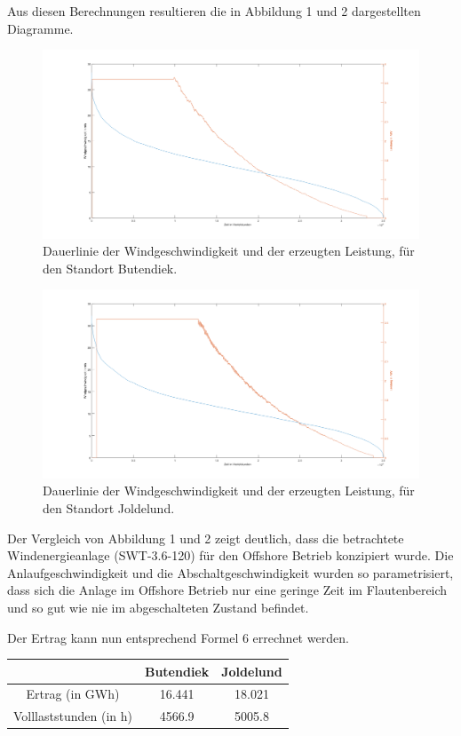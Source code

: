 \documentclass[a4paper,12pt]{article}
\begin{document}
	Aus diesen Berechnungen resultieren die in Abbildung 1 und 2 dargestellten Diagramme.
	\begin{figure}[H]
		\centering
		\includegraphics[width=12cm]{img/results/Dauerlinie_Offshore}
		\caption{Dauerlinie der Windgeschwindigkeit und der erzeugten Leistung, für den Standort Butendiek.}
	\end{figure}
	\begin{figure}[H]
		\centering
		\includegraphics[width=12cm]{img/results/Dauerlinie_Onshore}
		\caption{Dauerlinie der Windgeschwindigkeit und der erzeugten Leistung, für den Standort Joldelund.}
	\end{figure}
	\noindent Der Vergleich von Abbildung 1 und 2 zeigt deutlich, dass die betrachtete Windenergieanlage (SWT-3.6-120) für den Offshore Betrieb konzipiert wurde. Die Anlaufgeschwindigkeit und die Abschaltgeschwindigkeit wurden so parametrisiert, dass sich die Anlage im Offshore Betrieb nur eine geringe Zeit im Flautenbereich und so gut wie nie im abgeschalteten Zustand befindet.\\ \par
	\noindent Der Ertrag kann nun entsprechend Formel 6 errechnet werden.
	\begin{table}[h]
		\centering
		\begin{tabular}{|c|c|c|}
			\hline
			& Butendiek & Joldelund \\ \hline
			Ertrag (in GWh)        & 16.441    & 18.021    \\ \hline
			Volllaststunden (in h) & 4566.9    & 5005.8    \\ \hline
		\end{tabular}
	\end{table}
\end{document}
